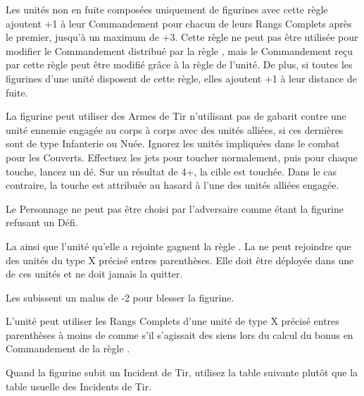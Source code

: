 

\startarmyspecialrules

\armyspecialruleentry{\safetyinnumbers}

Les unités non en fuite composées uniquement de figurines avec cette règle ajoutent +1 à leur Commandement pour chacun de leurs Rangs Complets après le premier, jusqu'à un maximum de +3. Cette règle ne peut pas être utilisée pour modifier le Commandement distribué par la règle \inspiringpresence{}, mais le Commandement reçu par cette règle peut être modifié grâce à la règle \safetyinnumbers{} de l'unité. De plus, si toutes les figurines d'une unité disposent de cette règle, elles ajoutent +1 à leur distance de fuite.


\armyspecialruleentry{\callous}

La figurine peut utiliser des Armes de Tir n'utilisant pas de gabarit contre une unité ennemie engagée au corps à corps avec des unités alliées, si ces dernières sont de type Infanterie ou Nuée. Ignorez les unités impliquées dans le combat pour les Couverts. Effectuez les jets pour toucher normalement, puis pour chaque touche, lancez un dé. Sur un résultat de 4+, la cible est touchée. Dans le cas contraire, la touche est attribuée au hasard à l'une des unités alliées engagée.


\armyspecialruleentry{\honourless}

Le Personnage ne peut pas être choisi par l'adversaire comme étant la figurine refusant un Défi.



La \warplatform{} ainsi que l'unité qu'elle a rejointe gagnent la règle \immunetopsychology{}. La \warplatform{} ne peut rejoindre que des unités du type X précisé entres parenthèses. Elle doit être déployée dans une de ces unités et ne doit jamais la quitter.


\armyspecialruleentry{\resistant}

Les \toxicattacks{} subissent un malus de -2 pour blesser la figurine.



L'unité peut utiliser les Rangs Complets d'une unité de type X précisé entres parenthèses à moins de  comme s'il s'agissait des siens lors du calcul du bonus en Commandement de la règle \safetyinnumbers{}.

\newpage
\armyspecialruleentry{\volatile}

Quand la figurine subit un Incident de Tir, utilisez la table suivante plutôt que la table usuelle des Incidents de Tir.

